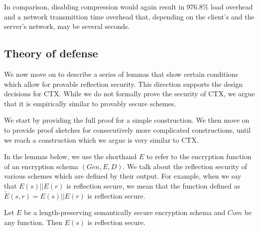 In comparison, disabling compression would again result in 976.8\% load overhead
and a network transmittion time overhead that, depending on the client's and the
server's network, may be several seconds.

\subsection{Theory of defense}

We now move on to describe a series of lemmas that show certain conditions
which allow for provable reflection security. This direction supports
the design decisions for CTX. While we do not formally prove the security of
CTX, we argue that it is empirically similar to provably secure schemes.

We start by providing the full proof for a simple construction. We then move on
to provide proof sketches for consecutively more complicated constructions,
until we reach a construction which we argue is very similar to CTX.

In the lemmas below, we use the shorthand $E$ to refer to the encryption
function of an encryption schema $(Gen, E, D)$. We talk about the reflection
security of various schemes which are defined by their output. For example,
when we say that $E(s) || E(r)$ is reflection secure, we mean that the function
defined as $\widetilde{E}(s, r) = E(s) || E(r)$ is reflection secure.

\begin{lemma}
    Let $E$ be a length-preserving semantically secure encryption schema and
    $Com$ be any function. Then $E(s)$ is reflection secure.
\end{lemma}

